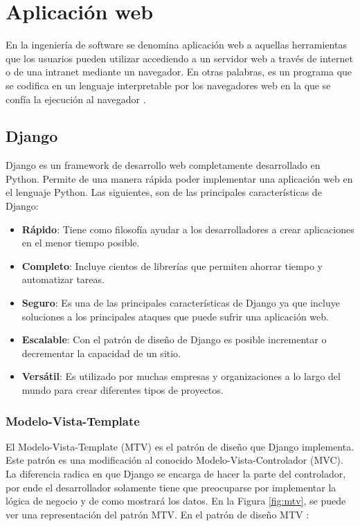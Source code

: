 \section{Aplicación web}
En la ingeniería de software se denomina aplicación web a aquellas herramientas que los usuarios pueden utilizar accediendo a un servidor web a través de internet o de una intranet mediante un navegador. En otras palabras, es un programa que se codifica en un lenguaje interpretable por los navegadores web en la que se confía la ejecución al navegador \cite{appweb}.

\subsection{Django}
Django es un framework de desarrollo web completamente desarrollado en Python. Permite de una manera rápida poder implementar una aplicación web en el lenguaje Python. Las siguientes, son de las principales características de Django:

\begin{itemize}
    \item \textbf{Rápido}: Tiene como filosofía ayudar a los desarrolladores a crear aplicaciones en el menor tiempo posible.
    \item \textbf{Completo}: Incluye cientos de librerías que permiten ahorrar tiempo y automatizar tareas.
    \item \textbf{Seguro}: Es una de las principales características de Django ya que incluye soluciones a los principales ataques que puede sufrir una aplicación web.
    \item \textbf{Escalable}: Con el patrón de diseño de Django es posible incrementar o decrementar la capacidad de un sitio.
    \item \textbf{Versátil}: Es utilizado por muchas empresas y organizaciones a lo largo del mundo para crear diferentes tipos de proyectos.
\end{itemize}

\subsubsection{Modelo-Vista-Template}
El Modelo-Vista-Template (MTV) es el patrón de diseño que Django implementa. Este patrón es una modificación al conocido Modelo-Vista-Controlador (MVC). La diferencia radica en que Django se encarga de hacer la parte del controlador, por ende el desarrollador solamente tiene que preocuparse por implementar la lógica de negocio y de como mostrará los datos. En la Figura \ref{fig:mtv}, se puede ver una representación del patrón MTV. En el patrón de diseño MTV \cite{mtv}:

